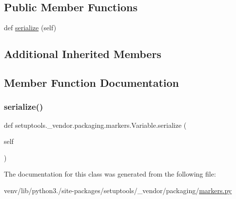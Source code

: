 \subsection*{Public Member Functions}
\begin{DoxyCompactItemize}
\item 
def \hyperlink{classsetuptools_1_1__vendor_1_1packaging_1_1markers_1_1Variable_a5010ba4eec07cc606f2bffec67144145}{serialize} (self)
\end{DoxyCompactItemize}
\subsection*{Additional Inherited Members}


\subsection{Member Function Documentation}
\mbox{\label{classsetuptools_1_1__vendor_1_1packaging_1_1markers_1_1Variable_a5010ba4eec07cc606f2bffec67144145}} 
\subsubsection{\texorpdfstring{serialize()}{serialize()}}
{\footnotesize\ttfamily def setuptools.\+\_\+vendor.\+packaging.\+markers.\+Variable.\+serialize (\begin{DoxyParamCaption}\item[{}]{self }\end{DoxyParamCaption})}



The documentation for this class was generated from the following file\+:\begin{DoxyCompactItemize}
\item 
venv/lib/python3./site-\/packages/setuptools/\+\_\+vendor/packaging/\hyperlink{setuptools_2__vendor_2packaging_2markers_8py}{markers.\+py}\end{DoxyCompactItemize}
